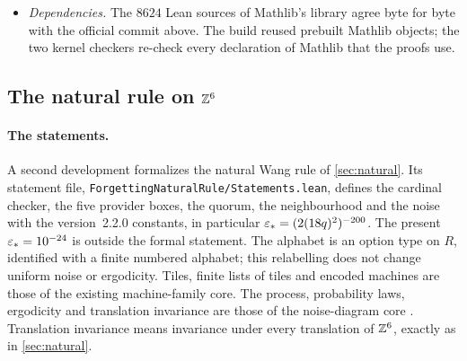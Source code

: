 \begin{itemize}
\begin{verbatim}
'FNE.cor_eight' depends on axioms: [propext, Classical.choice, Quot.sound]
'FNE.cor_eight_undecidable_statement' depends on axioms: [propext, Classical.choice, Quot.sound]
'FNE.cor_eight_undecidable' depends on axioms: [propext, Classical.choice, Quot.sound]
'FNE.nonergodic_not_re' depends on axioms: [propext, Classical.choice, Quot.sound]
'FNE.halts_not_computable' depends on axioms: [propext, Classical.choice, Quot.sound]
\end{verbatim}
\endgroup
\noindent Apart from the two open proofs of the challenge, no proof uses \texttt{sorry}, and no file declares an axiom or uses \texttt{native\_decide}, \texttt{implemented\_by} or \texttt{extern}.
\item \emph{Dependencies.} The $8624$ Lean sources of Mathlib's library agree byte for byte with the official commit above. The build reused prebuilt Mathlib objects; the two kernel checkers re-check every declaration of Mathlib that the proofs use.
\end{itemize}



\subsection*{The natural rule on $\mathbb{Z}^6$}

\paragraph{The statements.} A second development formalizes the natural Wang rule of \cref{sec:natural}. Its statement file, \texttt{ForgettingNaturalRule/Statements.lean}, defines the cardinal checker, the five provider boxes, the quorum, the neighbourhood and the noise with the version~2.2.0 constants, in particular $\varepsilon_*=(2(18q)^2)^{-200}$. The present $\varepsilon_*=10^{-24}$ is outside the formal statement. The alphabet is an option type on $R$, identified with a finite numbered alphabet; this relabelling does not change uniform noise or ergodicity. Tiles, finite lists of tiles and encoded machines are those of the existing machine-family core. The process, probability laws, ergodicity and translation invariance are those of the noise-diagram core \cite{DMdiagram}. Translation invariance means invariance under every translation of $\mathbb{Z}^6$, exactly as in \cref{sec:natural}.

